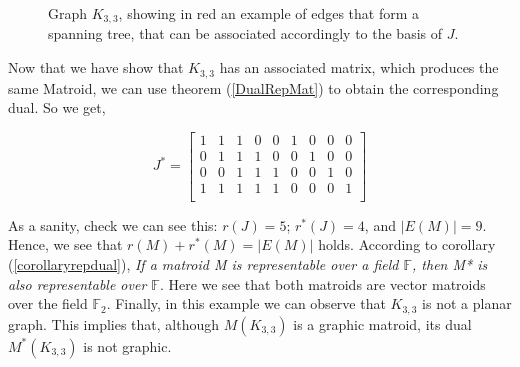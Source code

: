 \begin{exmp}
\begin{figure}[H]
    \centering
    \caption{Graph $K_{3,3}$, showing in red an example of edges that form a spanning tree, that can be associated accordingly to the basis of $J$.}
    \label{K33STE}
\end{figure}

Now that we have show that $K_{3,3}$ has an associated matrix, which produces the same Matroid, we can use theorem (\ref{DualRepMat}) to obtain the corresponding dual. 
So we get, 
\begin{figure}[H]
  $$J^*=\begin{bmatrix} 
1 & 1 & 1 & 0 & 0 & 1 & 0 & 0 & 0\\
0 & 1 & 1 & 1 & 0 & 0 & 1 & 0 & 0\\
0 & 0 & 1 & 1 & 1 & 0 & 0 & 1 & 0\\
1 & 1 & 1 & 1 & 1 & 0 & 0 & 0 & 1\\
\end{bmatrix}$$
\end{figure}

As a sanity, check we can see this: $r(J) = 5$;  $r^*(J)=4$, and $|E(M)|=9$. Hence, we see that $r(M) + r^*(M) = |E(M)|$ holds.
According to corollary (\ref{corollaryrepdual}), \textit{If a matroid \textit{M} is \textit{representable} over a field $\mathbb{F}$, then \textit{M*} is also representable over $\mathbb{F}$}. Here we see that both matroids are vector matroids over the field $\mathbb{F}_2$. 
Finally, in this example we can observe that $K_{3,3}$ is not a planar graph. This implies that, although $M(K_{3,3})$ is a graphic matroid, its dual $M^*(K_{3,3})$ is not graphic.

\end{exmp}
